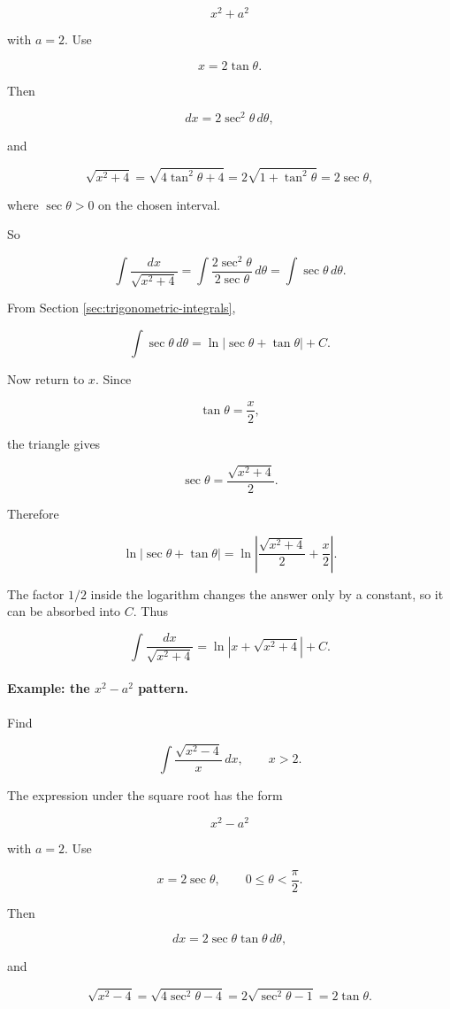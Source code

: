 \[
x^2+a^2
\]

with \(a=2\).  Use

\[
x=2\tan\theta.
\]

Then

\[
dx=2\sec^2\theta\,d\theta,
\]

and

\[
\sqrt{x^2+4}
=
\sqrt{4\tan^2\theta+4}
=
2\sqrt{1+\tan^2\theta}
=
2\sec\theta,
\]

where \(\sec\theta>0\) on the chosen interval.

So

\[
\int \frac{dx}{\sqrt{x^2+4}}
=
\int \frac{2\sec^2\theta}{2\sec\theta}\,d\theta
=
\int \sec\theta\,d\theta.
\]

From Section \ref{sec:trigonometric-integrals},

\[
\int \sec\theta\,d\theta
=
\ln|\sec\theta+\tan\theta|+C.
\]

Now return to \(x\).  Since

\[
\tan\theta=\frac{x}{2},
\]

the triangle gives

\[
\sec\theta=\frac{\sqrt{x^2+4}}{2}.
\]

Therefore

\[
\ln|\sec\theta+\tan\theta|
=
\ln\left|\frac{\sqrt{x^2+4}}{2}+\frac{x}{2}\right|.
\]

The factor \(1/2\) inside the logarithm changes the answer only by a constant, so it can
be absorbed into \(C\).  Thus

\[
\boxed{
\int \frac{dx}{\sqrt{x^2+4}}
=
\ln|x+\sqrt{x^2+4}|+C.
}
\]

\paragraph{Example: the \(x^2-a^2\) pattern.}
Find

\[
\int \frac{\sqrt{x^2-4}}{x}\,dx,
\qquad x>2.
\]

The expression under the square root has the form

\[
x^2-a^2
\]

with \(a=2\).  Use

\[
x=2\sec\theta,
\qquad
0\le\theta<\frac{\pi}{2}.
\]

Then

\[
dx=2\sec\theta\tan\theta\,d\theta,
\]

and

\[
\sqrt{x^2-4}
=
\sqrt{4\sec^2\theta-4}
=
2\sqrt{\sec^2\theta-1}
=
2\tan\theta.
\]

